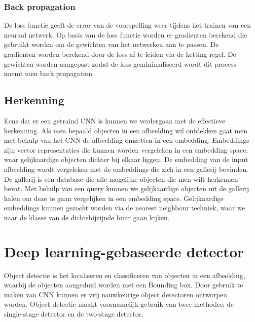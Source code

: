 \subsubsection{Back propagation}
De loss functie geeft de error van de voorspelling weer tijdens het trainen van een neuraal netwerk. Op basis van de loss functie worden er gradienten berekend die gebruikt worden om de gewichten van het netwerken aan te passen. De gradienten worden berekend door de loss af te leiden via de ketting regel. De gewichten worden aangepast zodat de loss geminimaliseerd wordt dit process noemt men back propagation



\subsection{Herkenning}
Eens dat er een getraind CNN is kunnen we verdergaan met de effectieve herkenning. Als men bepaald objecten in een afbeelding wil ontdekken gaat men met behulp van het CNN de afbeelding omzetten in een embedding. Embeddings zijn vector representaties die kunnen worden vergeleken in een embedding space, waar gelijkaardige objecten dichter bij elkaar liggen. De embedding van de input afbeelding wordt vergeleken met de embeddings die zich in een gallerij bevinden. De gallerij is een database die alle mogelijke objecten die men wilt herkennen bevat. Met behulp van een query kunnen we gelijkaardige objecten uit de gallerij halen om deze te gaan vergelijken in een embedding space. Gelijkaardige embeddings kunnen gezocht worden via de nearest neighbour techniek, waar we naar de klasse van de dichtsbijzijnde buur gaan kijken.


\section{Deep learning-gebaseerde detector}
Object detectie is het localiseren en classificeren van objecten in een afbeelding, waarbij de objecten aangeduid worden met een Bounding box. Door gebruik te maken van CNN kunnen er vrij nauwkeurige object detectoren ontworpen worden. Object detectie maakt voornamelijk gebruik van twee methodes: de single-stage detector en de two-stage detector.

